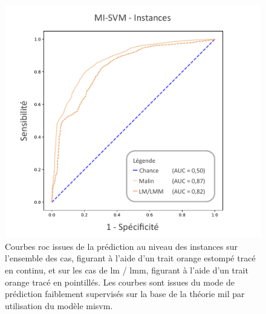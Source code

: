 \begin{figure}[H]
    \centering
    \includegraphics[width=0.7\linewidth]{contents/chapter_6/resources/results_lesion_roc_instances.pdf}
    \caption{Courbes \gls{roc} issues de la prédiction au niveau des instances sur l'ensemble des cas, figurant à l'aide d'un trait orange estompé tracé en continu, et sur les cas de \gls{lm} / \gls{lmm}, figurant à l'aide d'un trait orange tracé en pointillés. Les courbes sont issues  du mode de prédiction faiblement supervisés sur la base de la théorie \gls{mil} par utilisation du modèle \gls{misvm}.}
    \label{fig:results_lesion_roc_instances}
\end{figure}\par

